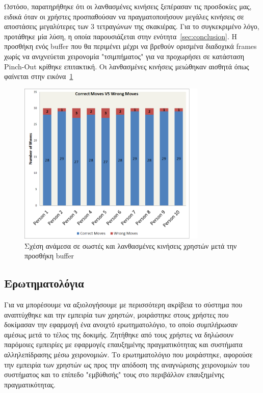 Ωστόσο, παρατηρήθηκε ότι οι λανθασμένες κινήσεις ξεπέρασαν τις προσδοκίες μας, ειδικά όταν οι χρήστες προσπαθούσαν να πραγματοποιήσουν μεγάλες κινήσεις σε αποστάσεις μεγαλύτερες των 3 τετραγώνων της σκακιέρας. Για το συγκεκριμένο λόγο, προτάθηκε μία λύση, η οποία παρουσιάζεται στην ενότητα~\ref{sec:conclusion}. Η προσθήκη ενός buffer που θα περιμένει μέχρι να βρεθούν ορισμένα διαδοχικά frames χωρίς να ανιχνεύεται χειρονομία "τσιμπήματος" για να προχωρήσει σε κατάσταση Pinch-Out κρίθηκε επιτακτική. Οι λανθασμένες κινήσεις μειώθηκαν αισθητά όπως φαίνεται στην εικόνα~\ref{fig:correctmoves2}

\begin{figure}[H]
    \centering
    \includegraphics[width=0.8\textwidth]{Files/Figures/correctmoves2.png}
    \caption[Σχέση ανάμεσα σε σωστές και λανθασμένες κινήσεις χρηστών μετά την προσθήκη buffer]{Σχέση ανάμεσα σε σωστές και λανθασμένες κινήσεις χρηστών μετά την προσθήκη buffer}
    \label{fig:correctmoves2}
\end{figure}




\subsection{Ερωτηματολόγια}

Για να μπορέσουμε να αξιολογήσουμε με περισσότερη ακρίβεια το σύστημα που αναπτύχθηκε και την εμπειρία των χρηστών, μοιράστηκε στους χρήστες που δοκίμασαν την εφαρμογή ένα ανοιχτό ερωτηματολόγιο, το οποίο συμπλήρωσαν αμέσως μετά το τέλος της δοκιμής. Ζητήθηκε από τους χρήστες να δηλώσουν παρόμοιες εμπειρίες με εφαρμογές επαυξημένης πραγματικότητας και συστήματα αλληλεπίδρασης μέσω χειρονομιών. Το ερωτηματολόγιο που μοιράστηκε, αφορούσε την εμπειρία των χρηστών ως προς την απόδοση της αναγνώρισης χειρονομιών του συστήματος και το επίπεδο "εμβύθισής" τους στο περιβάλλον επαυξημένης πραγματικότητας. 


